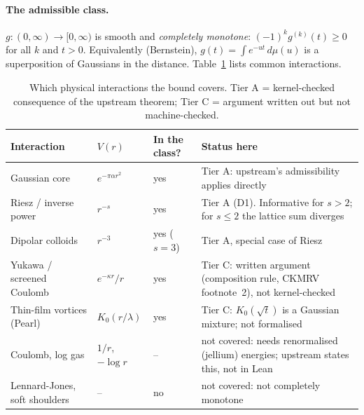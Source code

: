 \documentclass[11pt,a4paper]{article}
\begin{document}
\paragraph{The admissible class.} $g:(0,\infty)\to[0,\infty)$ is smooth and \emph{completely monotone}:
$(-1)^k g^{(k)}(t)\ge0$ for all $k$ and $t>0$. Equivalently (Bernstein), $g(t)=\int e^{-ut}\,d\mu(u)$ is a
superposition of Gaussians in the distance. Table~\ref{tab:class} lists common interactions.

\begin{table}[h]
\centering\small
\begin{tabular}{@{}lllp{6.1cm}@{}}
\toprule
Interaction & $V(r)$ & In the class? & Status here \\
\midrule
Gaussian core & $e^{-\pi\alpha r^2}$ & yes & Tier A: upstream's admissibility applies directly \\
Riesz / inverse power & $r^{-s}$ & yes & Tier A (D1). Informative for $s>2$; for $s\le2$ the lattice sum diverges \\
Dipolar colloids & $r^{-3}$ & yes ($s=3$) & Tier A, special case of Riesz \\
Yukawa / screened Coulomb & $e^{-\kappa r}/r$ & yes & Tier C: written argument (composition rule, CKMRV footnote~2), not kernel-checked \\
Thin-film vortices (Pearl) & $K_0(r/\lambda)$ & yes & Tier C: $K_0(\sqrt t)$ is a Gaussian mixture; not formalised \\
Coulomb, log gas & $1/r$, $-\log r$ & -- & not covered: needs renormalised (jellium) energies; upstream states this, not in Lean \\
Lennard-Jones, soft shoulders & -- & no & not covered: not completely monotone \\
\bottomrule
\end{tabular}
\caption{Which physical interactions the bound covers. Tier A = kernel-checked consequence of the upstream theorem;
Tier C = argument written out but not machine-checked.}\label{tab:class}
\end{table}
\end{document}
